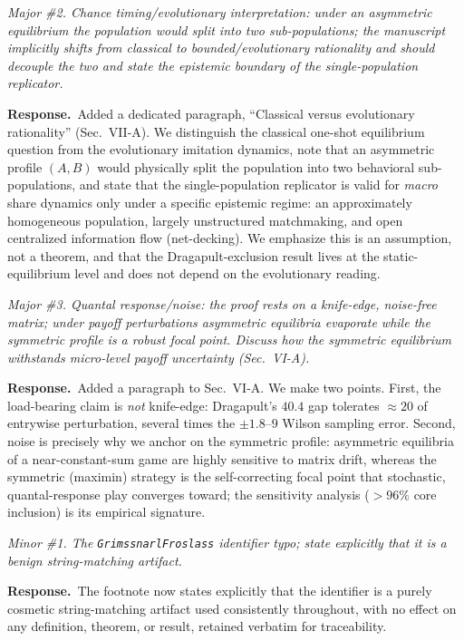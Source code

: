 \documentclass[11pt]{article}
\newcommand{\cmt}[1]{\par\smallskip\noindent\textit{#1}\par\smallskip}
\newcommand{\resp}{\par\noindent\textbf{Response.}\ }
\begin{document}
\cmt{Major \#2. Chance timing/evolutionary interpretation: under an asymmetric
equilibrium the population would split into two sub-populations; the manuscript
implicitly shifts from classical to bounded/evolutionary rationality and should
decouple the two and state the epistemic boundary of the single-population
replicator.}
\resp Added a dedicated paragraph, ``Classical versus evolutionary rationality''
(Sec.~VII-A). We distinguish the classical one-shot equilibrium question from the
evolutionary imitation dynamics, note that an asymmetric profile $(A,B)$ would
physically split the population into two behavioral sub-populations, and state
that the single-population replicator is valid for \emph{macro} share dynamics
only under a specific epistemic regime: an approximately homogeneous population,
largely unstructured matchmaking, and open centralized information flow
(net-decking). We emphasize this is an assumption, not a theorem, and that the
Dragapult-exclusion result lives at the static-equilibrium level and does not
depend on the evolutionary reading.

\cmt{Major \#3. Quantal response/noise: the proof rests on a knife-edge,
noise-free matrix; under payoff perturbations asymmetric equilibria evaporate
while the symmetric profile is a robust focal point. Discuss how the symmetric
equilibrium withstands micro-level payoff uncertainty (Sec.~VI-A).}
\resp Added a paragraph to Sec.~VI-A. We make two points. First, the load-bearing
claim is \emph{not} knife-edge: Dragapult's $40.4$\textperthousand{} gap tolerates
$\approx 20$\textperthousand{} of entrywise perturbation, several times the
$\pm 1.8$--$9$\textperthousand{} Wilson sampling error. Second, noise is precisely
why we anchor on the symmetric profile: asymmetric equilibria of a
near-constant-sum game are highly sensitive to matrix drift, whereas the symmetric
(maximin) strategy is the self-correcting focal point that stochastic,
quantal-response play converges toward; the sensitivity analysis ($>96\%$ core
inclusion) is its empirical signature.

\cmt{Minor \#1. The \texttt{GrimssnarlFroslass} identifier typo; state explicitly
that it is a benign string-matching artifact.}
\resp The footnote now states explicitly that the identifier is a purely cosmetic
string-matching artifact used consistently throughout, with no effect on any
definition, theorem, or result, retained verbatim for traceability.
\end{document}
